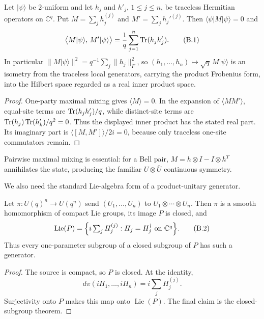 \begin{lemma}
\label{lem:local-generator-isometry}
Let \(\lvert\psi\rangle\) be \(2\)-uniform and let \(h_j\) and \(h'_j\),
\(1\leq j\leq n\), be traceless Hermitian operators on \(\mathbb C^q\).
Put \(M=\sum_jh_j^{(j)}\) and \(M'=\sum_jh_j'^{(j)}\).  Then
\(\langle\psi\rvert M\lvert\psi\rangle=0\) and
\[
 \bigl\langle M\lvert\psi\rangle,\,M'\lvert\psi\rangle\bigr\rangle
  =\frac1q\sum_{j=1}^n\operatorname{Tr}(h_jh'_j).                      \tag{B.1}
\]
In particular \(\lVert M\lvert\psi\rangle\rVert^2
 =q^{-1}\sum_j\lVert h_j\rVert_F^2\), so
\((h_1,\ldots,h_n)\mapsto\sqrt q\,M\lvert\psi\rangle\) is an isometry from
the traceless local generators, carrying the product Frobenius form, into
the Hilbert space regarded as a real inner product space.
\end{lemma}

\begin{proof}
One-party maximal mixing gives \(\langle M\rangle=0\).  In the expansion of
\(\langle MM'\rangle\), equal-site terms are
\(\operatorname{Tr}(h_jh'_j)/q\), while distinct-site terms are
\(\operatorname{Tr}(h_j)\operatorname{Tr}(h'_k)/q^2=0\).  Thus the displayed inner product has the
stated real part.  Its imaginary part is \(\langle[M,M']\rangle/2i=0\),
because only traceless one-site commutators remain.
\end{proof}

Pairwise maximal mixing is essential: for a Bell pair,
\(M=h\otimes I-I\otimes h^T\) annihilates the state, producing the familiar
\(U\otimes\overline U\) continuous symmetry.

We also need the standard Lie-algebra form of a product-unitary generator.

\begin{lemma}\label{lem:product-lie}
Let \(\pi:U(q)^n\to U(q^n)\) send \((U_1,\ldots,U_n)\) to
\(U_1\otimes\cdots\otimes U_n\).  Then \(\pi\) is a smooth homomorphism of
compact Lie groups, its image \(P\) is closed, and
\[
 \operatorname{Lie}(P)
  =\Bigl\{i\textstyle\sum_{j}H_j^{(j)}:
    H_j=H_j^\dagger\ \text{on }\mathbb C^q\Bigr\}.       \tag{B.2}
\]
Thus every one-parameter subgroup of a closed subgroup of \(P\) has such a
generator.
\end{lemma}

\begin{proof}
The source is compact, so \(P\) is closed.  At the identity,
\[
 d\pi(iH_1,\ldots,iH_n)=i\sum_jH_j^{(j)}.
\]
Surjectivity onto \(P\) makes this map onto \(\operatorname{Lie}(P)\).
The final claim is the closed-subgroup theorem.
\end{proof}

